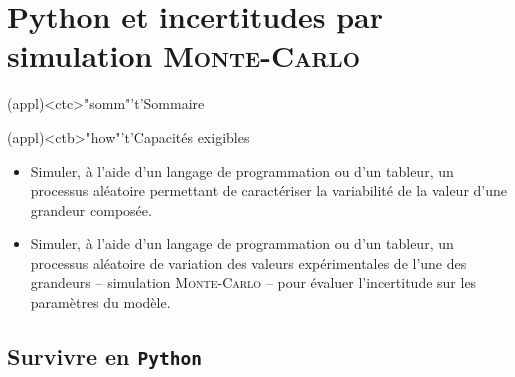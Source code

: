 \documentclass[a4paper, 12pt, garamond]{book}
\begin{document}
\setcounter{chapter}{4}


\chapter{Python et incertitudes par simulation \textsc{Monte-Carlo}}


\begin{tcn}(appl)<ctc>"somm"'t'{Sommaire}
	\let\item\olditem
	\vspace{-15pt}
	\minitoc
	\vspace{-25pt}
\end{tcn}

\begin{tcn}(appl)<ctb>"how"'t'{Capacités exigibles}
	\begin{itemize}[label=\rcheck]
		\item Simuler, à l'aide d’un langage de programmation ou d’un tableur, un
		      processus aléatoire permettant de caractériser la variabilité de la
		      valeur d’une grandeur composée.
		\item Simuler, à l'aide d’un langage de programmation ou d’un tableur, un
		      processus aléatoire de variation des valeurs expérimentales de
		      l'une des grandeurs – simulation \textsc{Monte-Carlo} – pour évaluer
		      l'incertitude sur les paramètres du modèle.
	\end{itemize}
\end{tcn}


\section{Survivre en \texttt{Python}}
\end{document}
